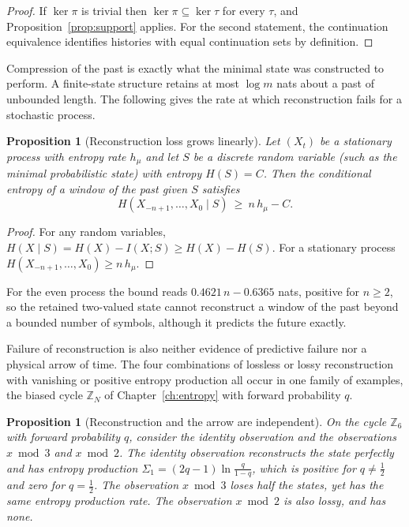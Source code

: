 \documentclass[11pt,oneside]{book}
\newtheorem{proposition}[theorem]{Proposition}
\theoremstyle{definition}
\theoremstyle{remark}
\begin{document}
\begin{proof}
If $\ker\pi$ is trivial then $\ker\pi\subseteq\ker\tau$ for every $\tau$, and Proposition~\ref{prop:support} applies. For the second statement, the continuation equivalence identifies histories with equal continuation sets by definition.
\end{proof}

Compression of the past is exactly what the minimal state was constructed to perform. A finite-state structure retains at most $\log m$ nats about a past of unbounded length. The following gives the rate at which reconstruction fails for a stochastic process.

\begin{proposition}[Reconstruction loss grows linearly]\label{prop:recon-rate}
Let $(X_t)$ be a stationary process with entropy rate $h_\mu$ and let $S$ be a discrete random variable (such as the minimal probabilistic state) with entropy $H(S)=C$. Then the conditional entropy of a window of the past given $S$ satisfies
\[
H(X_{-n+1},\dots,X_0\mid S)\ \geq\ n\,h_\mu-C .
\]
\end{proposition}

\begin{proof}
For any random variables, $H(X\mid S)=H(X)-I(X;S)\geq H(X)-H(S)$. For a stationary process $H(X_{-n+1},\dots,X_0)\geq n\,h_\mu$.
\end{proof}

For the even process the bound reads $0.4621\,n-0.6365$ nats, positive for $n\geq2$, so the retained two-valued state cannot reconstruct a window of the past beyond a bounded number of symbols, although it predicts the future exactly.

Failure of reconstruction is also neither evidence of predictive failure nor a physical arrow of time. The four combinations of lossless or lossy reconstruction with vanishing or positive entropy production all occur in one family of examples, the biased cycle $\mathbb Z_N$ of Chapter~\ref{ch:entropy} with forward probability $q$.

\begin{proposition}[Reconstruction and the arrow are independent]\label{prop:recon-arrow}
On the cycle $\mathbb Z_6$ with forward probability $q$, consider the identity observation and the observations $x\bmod3$ and $x\bmod2$. The identity observation reconstructs the state perfectly and has entropy production $\Sigma_1=(2q-1)\ln\frac q{1-q}$, which is positive for $q\neq\tfrac12$ and zero for $q=\tfrac12$. The observation $x\bmod3$ loses half the states, yet has the same entropy production rate. The observation $x\bmod2$ is also lossy, and has none.
\end{proposition}
\end{document}
